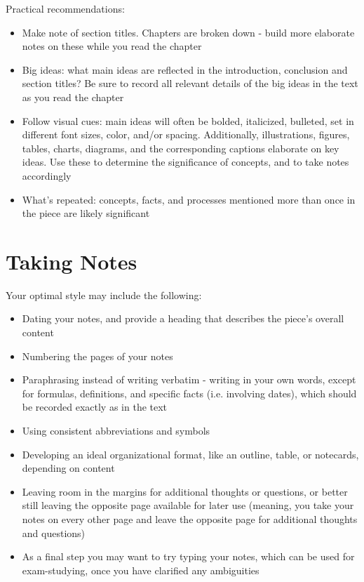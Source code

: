 Practical recommendations:
\begin{itemize}
\item Make note of section titles. Chapters are broken down - build more elaborate notes on these while you read the chapter
\item Big ideas: what main ideas are reflected in the introduction, conclusion and section titles? Be sure to record all relevant details of the big ideas in the text as you read the chapter
\item Follow visual cues: main ideas will often be bolded, italicized, bulleted, set in different font sizes, color, and/or spacing. Additionally, illustrations, figures, tables, charts, diagrams, and the corresponding captions elaborate on key ideas. Use these to determine the significance of concepts, and to take notes accordingly
\item What's repeated: concepts, facts, and processes mentioned more than once in the piece are likely significant
\end{itemize}

\section{Taking Notes}
Your optimal style may include the following:
\begin{itemize}
\item Dating your notes, and provide a heading that describes the piece's overall content
\item Numbering the pages of your notes
\item Paraphrasing instead of writing verbatim - writing in your own words, except for formulas, definitions, and specific facts (i.e. involving dates), which should be recorded exactly as in the text
\item Using consistent abbreviations and symbols
\item Developing an ideal organizational format, like an outline, table, or notecards, depending on content
\item Leaving room in the margins for additional thoughts or questions, or better still leaving the opposite page available for later use (meaning, you take your notes on every other page and leave the opposite page for additional thoughts and questions)
\item As a final step you may want to try typing your notes, which can be used for exam-studying, once you have clarified any ambiguities
\end{itemize}

